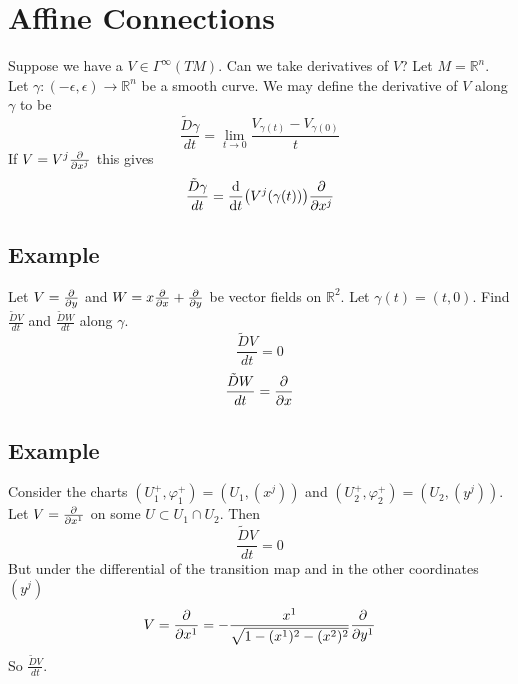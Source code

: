 \documentclass[a4paper]{article}
\begin{document}
\section*{Affine Connections}%
Suppose we have a $V \in \Gamma^{\infty}(TM)$. Can we take derivatives of $V$? Let $M=\mathds{R}^n$. Let $\gamma:(-\epsilon, \epsilon) \rightarrow \mathds{R}^n$ be a smooth curve. We may define the derivative of $V$ along $\gamma$ to be 
\[
  \frac{\tilde{D}\gamma}{dt} = \lim_{t \rightarrow 0} \frac{V_{\gamma(t)} - V_{\gamma(0)}}{t}
\]
If $V = V^j \pdv{x^j}$ this gives
\[
  \frac{\tilde{D}\gamma}{dt} =  \dv{t} (V^j(\gamma(t))) \pdv{x^j}
\]

\subsection*{Example}%
Let $V = \pdv{y}$ and $W = x\pdv{x} + \pdv{y}$ be vector fields on $\mathds{R}^2$. Let $\gamma(t) = (t,0)$. Find $\frac{\tilde{D}V}{dt}$ and $\frac{\tilde{D}W}{dt}$ along $\gamma$.
\[
  \frac{\tilde{D}V}{dt} = 0
\]
\[
  \frac{\tilde{D}W}{dt} = \pdv{x}
\]

\subsection*{Example}%
Consider the charts $(U_1^+, \varphi_1^+) = (U_1, (x^j))$ and $(U_2^+, \varphi_2^+) = (U_2, (y^j))$. Let $V = \pdv{x^1}$ on some $U \subset U_1 \cap U_2$. Then 
\[
  \frac{\tilde{D}V}{dt} = 0
\]
But under the differential of the transition map and in the other coordinates $(y^j)$
\[
  V = \pdv{x^1} = -\frac{x^1}{\sqrt{1 - (x^1)^2 - (x^2)^2}} \pdv{y^1}
\]
So $\frac{\tilde{D}V}{dt}$.
\end{document}
